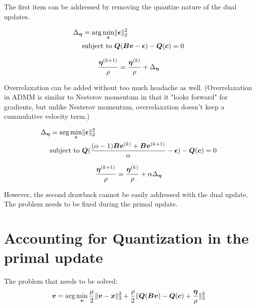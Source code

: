 \documentclass{article}
\begin{document}
The first item can be addressed by removing the quantize nature of the dual updates.

\begin{equation}
\begin{aligned}
\Delta_{\bm{\eta}} = \arg\min_{\bm{\epsilon}} & \|\bm{\epsilon}\|_2^2 \\
\text{subject to } & \bm{Q}(\bm{B}\bm{v} - \bm{\epsilon}) - \bm{Q}(\bm{c}) = 0 \\
\end{aligned}
\end{equation}

\begin{equation}
\frac{\bm{\eta}^{(k + 1)}}{\rho} = \frac{\bm{\eta}^{(k)}}{\rho} + \Delta_{\bm{\eta}}
\end{equation}

Overrelaxation can be added without too much headache as well. (Overrelaxation in ADMM is similar to Nesterov momentum in that it "looks forward" for gradients, but unlike Nesterov momentum, overrelaxation doesn't keep a cummulative velocity term.)

\begin{equation}
\begin{aligned}
\Delta_{\bm{\eta}} = \arg\min_{\bm{\epsilon}} & \|\bm{\epsilon}\|_2^2 \\
\text{subject to } & \bm{Q}(\frac{(\alpha - 1)\bm{B}\bm{v}^{(k)} + \bm{B}\bm{v}^{(k + 1)}}{\alpha} - \bm{\epsilon}) - \bm{Q}(\bm{c}) = 0 \\
\end{aligned}
\end{equation}

\begin{equation}
\frac{\bm{\eta}^{(k + 1)}}{\rho} = \frac{\bm{\eta}^{(k)}}{\rho} + \alpha\Delta_{\bm{\eta}}
\end{equation}

However, the second drawback cannot be easily addressed with the dual update. The problem needs to be fixed during the primal update.


\section{Accounting for Quantization in the primal update}

The problem that needs to be solved:
\begin{equation}
\bm{v} = \arg\min_{\bm{v}}  \frac{\mu}{2}\|\bm{v} - \bm{x}\|_2^2 + \frac{\rho}{2}\|\bm{Q}(\bm{B}\bm{v}) - \bm{Q}(\bm{c}) + \frac{\bm{\eta}}{\rho}\|_2^2
\end{equation}
\end{document}
